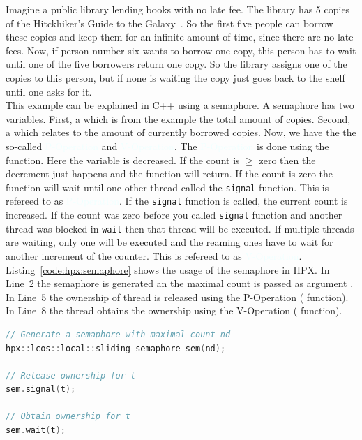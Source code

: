 \documentclass[11pt,fleqn]{book} %
\begin{document}
Imagine a public library lending books with no late fee. The library has 5 copies of the Hitckhiker's Guide to the Galaxy~\cite{adams2017ultimate}. So the first five people can borrow these copies and keep them for an infinite amount of time, since there are no late fees. Now, if person number six wants to borrow one copy, this person has to wait until one of the five borrowers return one copy. So the library assigns one of the copies to this person, but if none is waiting the copy just goes back to the shelf until one asks for it. \\

This example can be explained in C++ using a semaphore. A semaphore has two variables. First, a  which is from the example the total amount of copies. Second, a  which relates to the amount of currently borrowed copies. Now, we have the the so-called \textcolor{azure}{P-Operation} and \textcolor{azure}{V-Operation}. The \textcolor{azure}{P-Operation} is done using the  function. Here the variable  is decreased. If the count is $\geq$ zero then the decrement just happens and the function will return. If the count is zero the function will wait until one other thread called the \lstinline|signal| function. This is refereed to as \textcolor{azure}{P-Operation}. If the \lstinline|signal| function is called, the current count is increased. If the count was zero before you called \lstinline|signal| function and another thread was blocked in \lstinline|wait| then that thread will be executed. If multiple threads are waiting, only one will be executed and the reaming ones have to wait for another increment of the counter. This is refereed to as \textcolor{azure}{V-Operation}. Listing~\ref{code:hpx:semaphore} shows the usage of the semaphore in HPX. In Line~2 the semaphore is generated an the maximal count is passed as argument . In Line~5 the ownership of thread  is released using the P-Operation ( function). In Line~8 the thread  obtains the ownership using the V-Operation ( function).


\begin{lstlisting}[language=c++,caption={HPX's semaphores.\label{code:hpx:semaphore}},float,floatplacement=tb]
// Generate a semaphore with maximal count nd
hpx::lcos::local::sliding_semaphore sem(nd);

// Release ownership for t
sem.signal(t);

// Obtain ownership for t
sem.wait(t);
\end{lstlisting}
\end{document}
